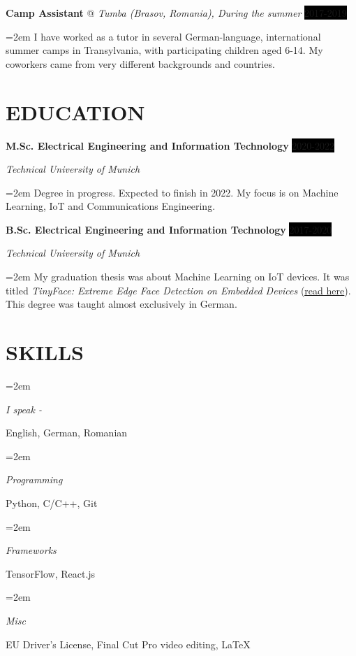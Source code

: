 \documentclass[paper=a4,fontsize=11pt]{scrartcl}
\makeatletter
\newlength{\spacebox}
\newcommand{\sepspace}{\vspace*{1em}}		%
\newcommand{\NewPart}[1]{\section*{\uppercase{#1}}}
\newcommand{\PersonalEntry}[2]{
		\noindent\hangindent=2em\hangafter=0 %
		\parbox{\spacebox}{        %
		\textit{#1}}		       %
		\hspace{1.5em} #2 \par}    %
\newcommand{\SkillsEntry}[2]{      %
		\noindent\hangindent=2em\hangafter=0 %
		\parbox{\spacebox}{        %
		\textit{#1}}			   %
		\hspace{1.5em} #2 \par}    %
\newcommand{\EducationEntry}[4]{
		\noindent \textbf{#1} \hfill      %
		\colorbox{Black}{\color{White}#2} \par  %
		\noindent \textit{#3} \par        %
		\noindent\hangindent=2em\hangafter=0 \small #4 %
		\normalsize \par}
\newcommand{\WorkEntry}[4]{				  %
		\noindent \textbf{#1} @ \textit{#3} \hfill      %
		\colorbox{Black}{\color{White}#2} \par  %
		\noindent\hangindent=2em\hangafter=0 \small #4 %
		\normalsize \par}
\makeatother
\begin{document}
\WorkEntry{Camp Assistant}{2017-2019}{Tumba (Brasov, Romania), During the summer}{I have worked as a tutor in several German-language, international summer camps in Transylvania, with participating children aged 6-14. My coworkers came from very different backgrounds and countries.}
\sepspace


\NewPart{Education}{}

\EducationEntry{M.Sc. Electrical Engineering and Information Technology}{2020-2022}{Technical University of Munich}{Degree in progress. Expected to finish in 2022. My focus is on Machine Learning, IoT and Communications Engineering.}
\sepspace

\EducationEntry{B.Sc. Electrical Engineering and Information Technology}{2017-2020}{Technical University of Munich}{My graduation thesis was about Machine Learning on IoT devices. It was titled \textit{TinyFace: Extreme Edge Face Detection on Embedded Devices} (\href{https://github.com/munober/thesis/blob/master/digital_edition.pdf}{\underline{read here}}). This degree was taught almost exclusively in German.}

\NewPart{Skills}{}

\SkillsEntry{I speak - }{English, German, Romanian}
\SkillsEntry{Programming}{Python, \textsc{C/C++}, Git}
\SkillsEntry{Frameworks}{TensorFlow, React.js}
\SkillsEntry{Misc}{EU Driver's License, Final Cut Pro video editing, \LaTeX}


\end{document}
